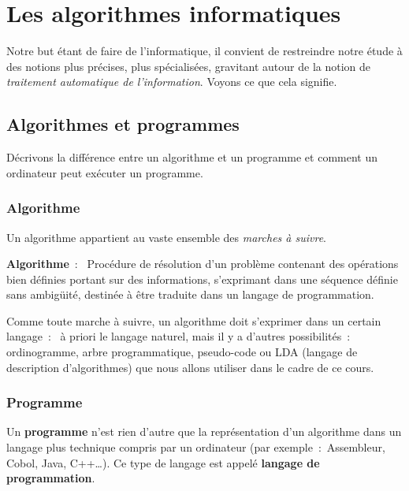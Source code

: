 \chapter{Les algorithmes informatiques}

	Notre but étant de faire de l’informatique, 
	il convient de restreindre notre étude 
	à des notions plus précises, plus spécialisées, 
	gravitant autour de la notion de 
	\textit{traitement automatique de l’information}.
	Voyons ce que cela signifie.

	\section{Algorithmes et programmes}
	
		Décrivons la différence entre un algorithme et un programme
		et comment un ordinateur peut exécuter un programme.
	
		\subsection{Algorithme}
		
			Un algorithme appartient au vaste ensemble 
			des \textit{marches à suivre}.
	
			\textbf{Algorithme}~:~
			Procédure de résolution d’un problème 
			contenant des opérations bien définies 
			portant sur des informations, 
			s’exprimant dans une séquence définie sans ambigüité, 
			destinée à être traduite dans un langage de programmation.
		
			Comme toute marche à suivre, 
			un algorithme doit s’exprimer dans un certain langage~:~
			à priori le langage naturel, 
			mais il y a d’autres possibilités~:~
			ordinogramme, arbre programmatique, pseudo-code ou LDA
			(langage de description d’algorithmes) 
			que nous allons utiliser dans le cadre de ce cours.
	
		\subsection{Programme}
		
			Un \textbf{programme} n’est rien d’autre 
			que la représentation d’un algorithme 
			dans un langage plus technique compris par un ordinateur 
			(par exemple~:~Assembleur, Cobol, Java, C++\dots). 
			Ce type de langage est appelé 
			\textbf{langage de programmation}.
			
